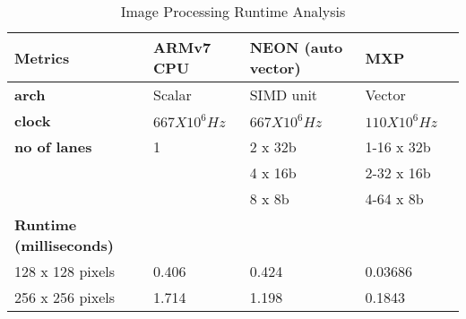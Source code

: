 \begin{table}[htbp]
	\centering
		\begin{adjustbox}{width=.8\textwidth}
		\small
	\begin{tabular}{lllll}
		\toprule
		\textbf{Metrics} & \textbf{ARMv7 CPU} & \textbf{NEON (auto vector)} & \textbf{MXP} \\
		\midrule
		\textbf{arch} & Scalar & SIMD unit & Vector \\
		\textbf{clock} & $667 X 10^{6}Hz$ & $667 X 10^{6}Hz$ & $110 X 10^{6}Hz$ \\
		\textbf{no of lanes} & 1 & 2 x 32b & 1-16 x 32b \\
		&   & 4 x 16b & 2-32 x 16b \\
		&   & 8 x 8b & 4-64 x 8b \\
		\midrule
	\textbf{Runtime (milliseconds)} &   &   &  \\
		\midrule
     128 x  128      pixels & 0.406 & 0.424 & 0.03686  \\	
	 256 x  256      pixels & 1.714 & 1.198 & 0.1843  \\
		\bottomrule
	\end{tabular}%
     \end{adjustbox}%
	\caption{Image Processing Runtime Analysis}
		\label{ga:100}%
\end{table}%